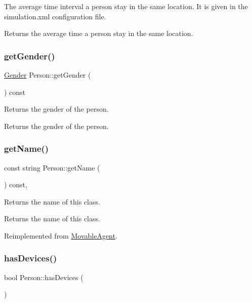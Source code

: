 The average time interval a person stay in the same location. It is given in the simulation.\+xml configuration file. \begin{DoxyReturn}{Returns}
the average time a person stay in the same location. 
\end{DoxyReturn}
\mbox{\label{class_person_adb5a4fabaaa6bf851de701aeb9df4fdf}} 
\subsubsection{\texorpdfstring{get\+Gender()}{getGender()}}
{\footnotesize\ttfamily \hyperlink{class_person_aff84ca16bd4dbf364614d86f20b29dd2}{Gender} Person\+::get\+Gender (\begin{DoxyParamCaption}{ }\end{DoxyParamCaption}) const}

Returns the gender of the person. \begin{DoxyReturn}{Returns}
the gender of the person. 
\end{DoxyReturn}
\mbox{\label{class_person_aa2a6f8d7f1d94045a03ca578f2ed272c}} 
\subsubsection{\texorpdfstring{get\+Name()}{getName()}}
{\footnotesize\ttfamily const string Person\+::get\+Name (\begin{DoxyParamCaption}{ }\end{DoxyParamCaption}) const\hspace{0.3cm}{\ttfamily [override]}, {\ttfamily [virtual]}}

Returns the name of this class. \begin{DoxyReturn}{Returns}
the name of this class. 
\end{DoxyReturn}


Reimplemented from \hyperlink{class_movable_agent_abcc1218876c39c996f2cb1eba2b96379}{Movable\+Agent}.

\mbox{\label{class_person_a40d6f2c716dd3c9794067817a3fb9165}} 
\subsubsection{\texorpdfstring{has\+Devices()}{hasDevices()}}
{\footnotesize\ttfamily bool Person\+::has\+Devices (\begin{DoxyParamCaption}{ }\end{DoxyParamCaption})}

